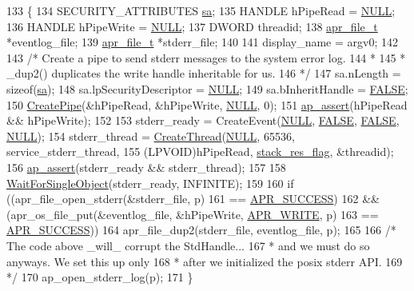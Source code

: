 \begin{DoxyCode}
133 \{
134     SECURITY\_ATTRIBUTES \hyperlink{group__apr__network__io_ga5dc1cb3876df6ab646ee9b3d528cbd9f}{sa};
135     HANDLE hPipeRead = \hyperlink{pcre_8txt_ad7f989d16aa8ca809a36bc392c07fba1}{NULL};
136     HANDLE hPipeWrite = \hyperlink{pcre_8txt_ad7f989d16aa8ca809a36bc392c07fba1}{NULL};
137     DWORD  threadid;
138     \hyperlink{structapr__file__t}{apr\_file\_t} *eventlog\_file;
139     \hyperlink{structapr__file__t}{apr\_file\_t} *stderr\_file;
140 
141     display\_name = argv0;
142 
143     \textcolor{comment}{/* Create a pipe to send stderr messages to the system error log.}
144 \textcolor{comment}{     *}
145 \textcolor{comment}{     * \_dup2() duplicates the write handle inheritable for us.}
146 \textcolor{comment}{     */}
147     sa.nLength = \textcolor{keyword}{sizeof}(\hyperlink{group__apr__network__io_ga5dc1cb3876df6ab646ee9b3d528cbd9f}{sa});
148     sa.lpSecurityDescriptor = \hyperlink{pcre_8txt_ad7f989d16aa8ca809a36bc392c07fba1}{NULL};
149     sa.bInheritHandle = \hyperlink{group__MOD__SSL__PRIVATE_gaa93f0eb578d23995850d61f7d61c55c1}{FALSE};
150     \hyperlink{apr__dbg__win32__handles_8h_a0872b347a685985afba5bd2d29efe6a6}{CreatePipe}(&hPipeRead, &hPipeWrite, \hyperlink{pcre_8txt_ad7f989d16aa8ca809a36bc392c07fba1}{NULL}, 0);
151     \hyperlink{group__APACHE__CORE__DAEMON_gace52c7d9cc135b00b6e686236c0095a7}{ap\_assert}(hPipeRead && hPipeWrite);
152 
153     stderr\_ready = CreateEvent(\hyperlink{pcre_8txt_ad7f989d16aa8ca809a36bc392c07fba1}{NULL}, \hyperlink{group__MOD__SSL__PRIVATE_gaa93f0eb578d23995850d61f7d61c55c1}{FALSE}, \hyperlink{group__MOD__SSL__PRIVATE_gaa93f0eb578d23995850d61f7d61c55c1}{FALSE}, \hyperlink{pcre_8txt_ad7f989d16aa8ca809a36bc392c07fba1}{NULL});
154     stderr\_thread = \hyperlink{apr__dbg__win32__handles_8h_a4b0e5453079adac42d3589f948d8b81e}{CreateThread}(\hyperlink{pcre_8txt_ad7f989d16aa8ca809a36bc392c07fba1}{NULL}, 65536, service\_stderr\_thread,
155                                  (LPVOID)hPipeRead, \hyperlink{group__APACHE__MPM__WINNT_ga06a5de2d3462ffb00e0dbbeed5be5868}{stack\_res\_flag}, &threadid);
156     \hyperlink{group__APACHE__CORE__DAEMON_gace52c7d9cc135b00b6e686236c0095a7}{ap\_assert}(stderr\_ready && stderr\_thread);
157 
158     \hyperlink{apr__dbg__win32__handles_8h_afc860bc74827299798af7532aab62924}{WaitForSingleObject}(stderr\_ready, INFINITE);
159 
160     \textcolor{keywordflow}{if} ((apr\_file\_open\_stderr(&stderr\_file, p)
161              == \hyperlink{group__apr__errno_ga9ee311b7bf1c691dc521d721339ee2a6}{APR\_SUCCESS})
162      && (apr\_os\_file\_put(&eventlog\_file, &hPipeWrite, \hyperlink{group__apr__file__open__flags_ga3e427e53aceb1ccdb078d9a03cd63d01}{APR\_WRITE}, p)
163              == \hyperlink{group__apr__errno_ga9ee311b7bf1c691dc521d721339ee2a6}{APR\_SUCCESS}))
164         apr\_file\_dup2(stderr\_file, eventlog\_file, p);
165 
166     \textcolor{comment}{/* The code above \_will\_ corrupt the StdHandle...}
167 \textcolor{comment}{     * and we must do so anyways.  We set this up only}
168 \textcolor{comment}{     * after we initialized the posix stderr API.}
169 \textcolor{comment}{     */}
170     ap\_open\_stderr\_log(p);
171 \}
\end{DoxyCode}
